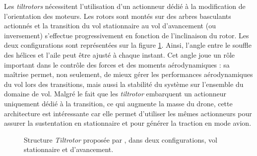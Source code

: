         Les \textit{tiltrotors} nécessitent l'utilisation d'un actionneur dédié à la modification de l'orientation des moteurs. Les rotors sont montés sur des arbres basculants actionnés et la transition du vol stationnaire au vol d'avancement (ou inversement) s'effectue progressivement en fonction de l'inclinaison du rotor. Les deux configurations sont représentées sur la figure \ref{fig:tiltrotor}. Ainsi, l'angle entre le souffle des hélices et l'aile peut être ajusté à chaque instant. Cet angle joue un rôle important dans le contrôle des forces et des moments aérodynamiques : sa maîtrise permet, non seulement, de mieux gérer les performances aérodynamiques du vol lors des transitions, mais aussi la stabilité du système sur l'ensemble du domaine de vol. 
        Malgré le fait que les \textit{tiltrotor} embarquent un actionneur uniquement dédié à la transition, ce qui augmente la masse du drone, cette architecture est intéressante car elle permet d'utiliser les mêmes actionneurs pour assurer la sustentation en stationnaire et pour générer la traction en mode avion.
        \begin{figure}[ht!]
            \centering
            \caption{Structure \textit{Tiltrotor}  proposée par \cite{7040348}, dans deux configurations, vol stationnaire et d'avancement.}
            \label{fig:tiltrotor}
        \end{figure}


        

